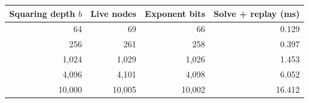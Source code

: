 \begin{tabular}{rrrr}
\toprule
Squaring depth $b$ & Live nodes & Exponent bits & Solve + replay (ms)\\
\midrule
64 & 69 & 66 & 0.129\\
256 & 261 & 258 & 0.397\\
1,024 & 1,029 & 1,026 & 1.453\\
4,096 & 4,101 & 4,098 & 6.052\\
10,000 & 10,005 & 10,002 & 16.412\\
\bottomrule
\end{tabular}
